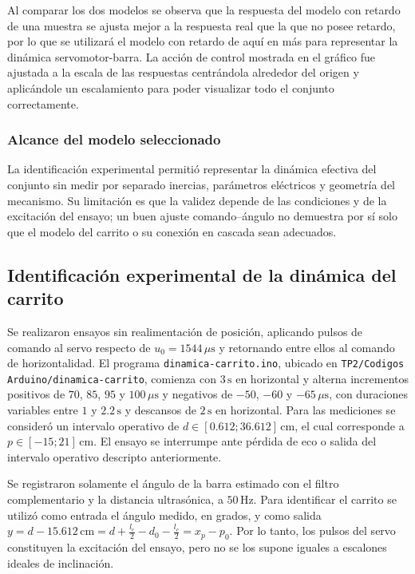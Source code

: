 \documentclass[a4paper, twoside, 10pt, spanish]{article}
\numberwithin{table}{section}
\begin{document}
    Al comparar los dos modelos se observa que la respuesta del modelo con retardo de una muestra se ajusta mejor a la respuesta real que la que no posee retardo, por lo que se utilizará el modelo con retardo de aquí en más para representar la dinámica servomotor-barra. La acción de control mostrada en el gráfico fue ajustada a la escala de las respuestas centrándola alrededor del origen y aplicándole un escalamiento para poder visualizar todo el conjunto correctamente.

    \subsubsection{Alcance del modelo seleccionado}
    La identificación experimental permitió representar la dinámica efectiva del conjunto sin medir por separado inercias, parámetros eléctricos y geometría del mecanismo. Su limitación es que la validez depende de las condiciones y de la excitación del ensayo; un buen ajuste comando--ángulo no demuestra por sí solo que el modelo del carrito o su conexión en cascada sean adecuados.

    \subsection{Identificación experimental de la dinámica del carrito}
    Se realizaron ensayos sin realimentación de posición, aplicando pulsos de comando al servo respecto de $u_0=1544\,\mu\text{s}$ y retornando entre ellos al comando de horizontalidad. El programa \texttt{dinamica-carrito.ino}, ubicado en \texttt{TP2/Codigos Arduino/dinamica-carrito}, comienza con $3\,\text{s}$ en horizontal y alterna incrementos positivos de $70$, $85$, $95$ y $100\,\mu\text{s}$ y negativos de $-50$, $-60$ y $-65\,\mu\text{s}$, con duraciones variables entre $1$ y $2.2\,\text{s}$ y descansos de $2\,\text{s}$ en horizontal. Para las mediciones se consideró un intervalo operativo de $d \in [0.612;36.612]\,\text{cm}$, el cual corresponde a $ p\in[-15;21]\,\text{cm}$. El ensayo se interrumpe ante pérdida de eco o salida del intervalo operativo descripto anteriormente.

    Se registraron solamente el ángulo de la barra estimado con el filtro complementario y la distancia ultrasónica, a $50\,\text{Hz}$. Para identificar el carrito se utilizó como entrada el ángulo medido, en grados, y como salida $y=d-15.612\,\text{cm} = d + \frac{l_c}{2} - d_0 - \frac{l_c}{2} = x_p - p_0$. Por lo tanto, los pulsos del servo constituyen la excitación del ensayo, pero no se los supone iguales a escalones ideales de inclinación.
\end{document}
